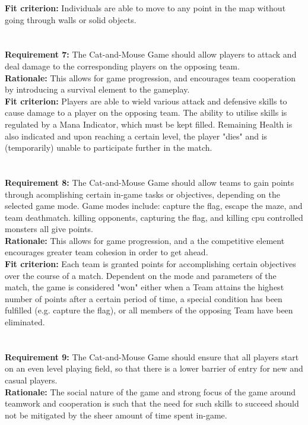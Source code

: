\documentclass[12pt, titlepage]{article}
\begin{document}
\textbf{Fit criterion:}  Individuals are able to move to any point in the map without going through walls or solid objects.\\
\\\\
\textbf{Requirement 7:}  The Cat-and-Mouse Game should allow players to attack and deal damage to the corresponding players on the opposing team. \\
\textbf{Rationale:}  This allows for game progression, and encourages team cooperation by introducing a survival element to the gameplay.\\
\textbf{Fit criterion:}  Players are able to wield various attack and defensive skills to cause damage to a player on the opposing team. The ability to utilise  skills is regulated by a Mana Indicator, which must be kept filled. Remaining Health is also indicated and upon reaching a certain level, the player "dies" and is (temporarily) unable to participate further in the match.\\
\\\\
\textbf{Requirement 8:}  The Cat-and-Mouse Game should allow teams to gain points through acomplishing certain in-game tasks or objectives, depending on the selected game mode. Game modes include: capture the flag, escape the maze, and team deathmatch. killing opponents, capturing the flag, and killing cpu controlled monsters all give points.\\
\textbf{Rationale:}  This allows for game progression, and a the competitive element encourages greater team cohesion in order to get ahead.\\
\textbf{Fit criterion:}  Each team is granted points for accomplishing certain objectives over the course of a match. Dependent on the mode and parameters of the match, the game is considered "won" either when a Team attains the highest number of points after a certain period of time, a special condition has been fulfilled (e.g. capture the flag), or all members of the opposing Team have been eliminated.  \\
\\\\
\textbf{Requirement 9:}  The Cat-and-Mouse Game should ensure that all players start on an even level playing field, so that there is a lower barrier of entry for new and casual players.\\
\textbf{Rationale:}  The social nature of the game and strong focus of the game around teamwork and cooperation is such that the need for such skills to succeed should not be mitigated by the sheer amount of time spent in-game.\\
\end{document}
